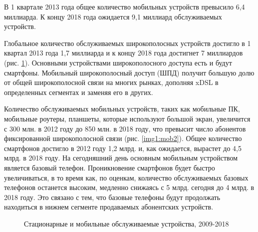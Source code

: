 В 1 квартале 2013 года общее количество мобильных устройств превысило 6,4 миллиарда. К концу 2018 года ожидается 9,1 миллиард обслуживаемых устройств. 

Глобальное количество обслуживаемых широкополосных устройств достигло в 1 квартал 2013 года 1,7 миллиарда и к концу 2018 года достигнет 7 миллиардов (рис. \ref{img1:mob1}). Основными устройствами широкополосного доступа есть и будут смартфоны. Мобильный широкополосный доступ (ШПД) получит большую долю от общей широкополосной связи на многих рынках, дополняя xDSL в определенных сегментах и заменяя его в других. 

Количество обслуживаемых мобильных устройств, таких как мобильные ПК, мобильные роутеры, планшеты, которые используют большой экран, увеличится с 300 млн. в 2012 году до 850 млн. в 2018 году, что превысит число абонентов фиксированной широкополосной связи (рис. \ref{img1:mob2}).
Общее количество смартфонов достигло в 2012 году 1,2 млрд. и, как ожидается, вырастет до 4,5 млрд. в 2018 году. На сегодняшний день основным мобильным устройством является базовый телефон. Проникновение смартфонов будет быстро увеличиваться, в то время как, по оценкам, количество обслуживаемых базовых телефонов останется высоким, медленно снижаясь с 5 млрд. сегодня до 4 млрд. в 2018 году. Это связано с тем, что базовые телефоны будут продолжать находиться в нижнем сегменте продаваемых абонентских устройств.

\pgfplotsset{width=15cm, height=10cm, compat=1.3}
\begin{figure} [!h]
  \center
{}
\caption{Стационарные и мобильные обслуживаемые устройства, 2009-2018 \cite{ericsson}}
  \label{img1:mob1}
\end{figure}


